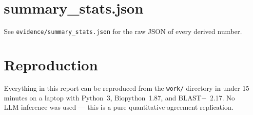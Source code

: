 \documentclass[11pt,letterpaper]{article}
\begin{document}
\appendix
\section{summary\_stats.json}
See \texttt{evidence/summary\_stats.json} for the raw JSON of every derived number.

\section{Reproduction}
Everything in this report can be reproduced from the \texttt{work/} directory in under 15 minutes on a laptop with Python~3, Biopython~1.87, and BLAST+~2.17. No LLM inference was used --- this is a pure quantitative-agreement replication.
\end{document}
